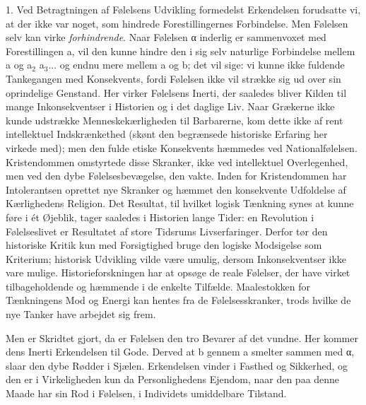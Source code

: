 \documentclass[12pt,a4paper,openany]{book}
\newcommand{\opage}[1]{\marginnote{\footnotesize\textit{[#1]}}}
\begin{document}
1. Ved Betragtningen af Følelsens Udvikling formedelst Erkendelsen
forudsatte vi, at der ikke var noget, som hindrede Forestillingernes
Forbindelse. Men Følelsen selv kan virke \emph{forhindrende}. Naar
Følelsen α inderlig er sammenvoxet med Forestillingen a, vil den kunne
hindre den i sig selv naturlige Forbindelse mellem a og a$_{2}$
a$_{3}$... og endnu mere mellem a og b; det vil sige: vi kunne ikke
fuldende Tankegangen med Konsekvents, fordi Følelsen ikke vil strække
sig ud over sin oprindelige Genstand. Her virker Følelsens Inerti, der
saaledes bliver Kilden til mange Inkonsekventser i Historien og i det
daglige Liv. Naar Grækerne ikke kunde udstrække Menneskekærligheden til
Barbarerne, kom dette ikke af rent intellektuel Indskrænkethed (skønt
den begrænsede historiske Erfaring her virkede med); men den fulde
etiske Konsekvents hæmmedes ved Nationalfølelsen. Kristendommen
omstyrtede disse Skranker, ikke ved intellektuel Overlegenhed, men ved
den dybe Følelsesbevægelse, den vakte. Inden for Kristendommen har
Intolerantsen oprettet nye Skranker og hæmmet den konsekvente Udfoldelse
af Kærlighedens Religion. Det Resultat, til hvilket logisk Tænkning
synes at kunne føre i ét Øjeblik, tager saaledes i Historien lange
Tider: en Revolution i Følelseslivet er Resultatet af store Tidsrums
Livserfaringer. Derfor tør den historiske Kritik kun med Forsigtighed
bruge den logiske Modsigelse som Kriterium; historisk Udvikling vilde
være umulig, dersom Inkonsekventser ikke vare mulige.
Historieforskningen har at opsøge de reale Følelser, der have virket
tilbageholdende og hæmmende i de enkelte Tilfælde. Maalestokken for
Tænkningens Mod og Energi kan hentes fra
\opage{353}de Følelsesskranker, trods hvilke de nye Tanker have arbejdet
sig frem.

Men er Skridtet gjort, da er Følelsen den tro Bevarer af det vundne. Her
kommer dens Inerti Erkendelsen til Gode. Derved at b gennem a smelter
sammen med α, slaar den dybe Rødder i Sjælen. Erkendelsen vinder i
Fasthed og Sikkerhed, og den er i Virkeligheden kun da Personlighedens
Ejendom, naar den paa denne Maade har sin Rod i Følelsen, i Individets
umiddelbare Tilstand.
\end{document}

